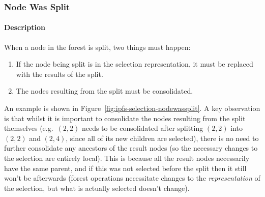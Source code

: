 \afterpage{\clearpage}
\newpage

\subsubsection{Node Was Split}

\paragraph{Description}

When a node in the forest is split, two things must happen:

\begin{enumerate}

\item If the node being split is in the selection representation, it must be replaced with the results of the split.
\item The nodes resulting from the split must be consolidated.

\end{enumerate}

\noindent An example is shown in Figure~\ref{fig:ipfs-selection-nodewassplit}. A key observation is that whilst it is important to consolidate the nodes resulting from the split themselves (e.g.~$(2,2)$ needs to be consolidated after splitting $(2,2)$ into $(2,2)$ and $(2,4)$, since all of its new children are selected), there is no need to further consolidate any ancestors of the result nodes (so the necessary changes to the selection are entirely local). This is because all the result nodes necessarily have the same parent, and if this was not selected before the split then it still won't be afterwards (forest operations necessitate changes to the \emph{representation} of the selection, but what is actually selected doesn't change).

